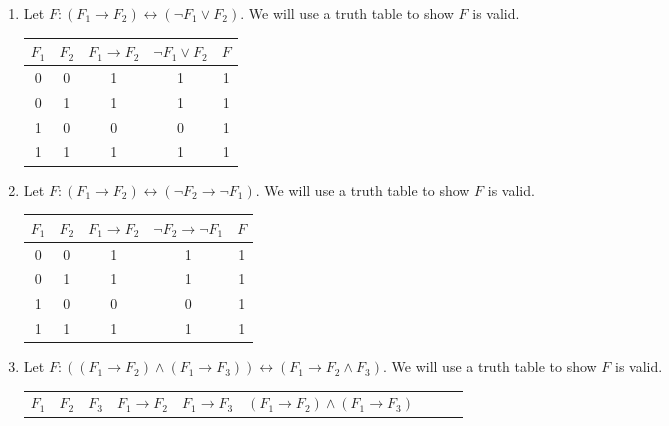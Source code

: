 \begin{exer}[1.2]
\begin{enumerate}[label=(\alph*)]
        \item %
            Let $F: (F_1 \rightarrow F_2) \leftrightarrow (\neg F_1 \lor F_2)$.
            We will use a truth table to show $F$ is valid.
            \begin{center}
                \begin{tabular}{ |c|c||c|c|c| }
                    \hline
                        $F_1$ & $F_2$ & $F_1 \rightarrow F_2$ & $\neg F_1 \lor F_2$ & $F$ \\ \hline
                        0 & 0 & 1 & 1 & 1 \\ \hline
                        0 & 1 & 1 & 1 & 1 \\ \hline
                        1 & 0 & 0 & 0 & 1 \\ \hline
                        1 & 1 & 1 & 1 & 1 \\ \hline
                \end{tabular}
            \end{center}
        \item %
            Let $F: (F_1 \rightarrow F_2) \leftrightarrow (\neg F_2 \rightarrow \neg F_1)$.
            We will use a truth table to show $F$ is valid.
            \begin{center}
                \begin{tabular}{ |c|c||c|c|c| }
                    \hline
                        $F_1$ & $F_2$ & $F_1 \rightarrow F_2$ & $\neg F_2 \rightarrow \neg F_1$ & $F$ \\ \hline
                        0 & 0 & 1 & 1 & 1 \\ \hline
                        0 & 1 & 1 & 1 & 1 \\ \hline
                        1 & 0 & 0 & 0 & 1 \\ \hline
                        1 & 1 & 1 & 1 & 1 \\ \hline
                \end{tabular}
            \end{center}
            \addtocounter{enumi}{4} %
        \item %
            Let $F: ((F_1 \rightarrow F_2) \land (F_1 \rightarrow F_3)) \leftrightarrow (F_1 \rightarrow F_2 \land F_3)$.
            We will use a truth table to show $F$ is valid.
            \begin{center}
                \begin{tabular}{ |c|c|c||c|c|c|c|c|c| }
                    \hline
                        $F_1$ & $F_2$ & $F_3$ & $F_1 \rightarrow F_2$ & $F_1 \rightarrow F_3$ & $(F_1 \rightarrow F_2) \land (F_1 \rightarrow F_3)$ &

\end{tabular}
\end{center}
\end{enumerate}
\end{exer}
